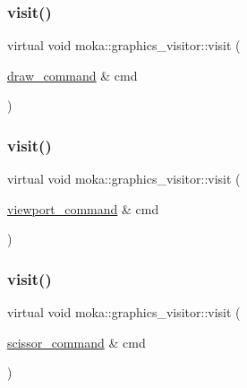 \mbox{\label{classmoka_1_1graphics__visitor_a706120c8d7ec9a21f347f06ff56ad8c9}} 
\subsubsection{\texorpdfstring{visit()}{visit()}\hspace{0.1cm}{\footnotesize\ttfamily [2/10]}}
{\footnotesize\ttfamily virtual void moka\+::graphics\+\_\+visitor\+::visit (\begin{DoxyParamCaption}\item[{\mbox{\hyperlink{classmoka_1_1draw__command}{draw\+\_\+command}} \&}]{cmd }\end{DoxyParamCaption})\hspace{0.3cm}{\ttfamily [pure virtual]}}

\mbox{\label{classmoka_1_1graphics__visitor_a1808e0ed3533d53505bb15d559a7b3f7}} 
\subsubsection{\texorpdfstring{visit()}{visit()}\hspace{0.1cm}{\footnotesize\ttfamily [3/10]}}
{\footnotesize\ttfamily virtual void moka\+::graphics\+\_\+visitor\+::visit (\begin{DoxyParamCaption}\item[{\mbox{\hyperlink{classmoka_1_1viewport__command}{viewport\+\_\+command}} \&}]{cmd }\end{DoxyParamCaption})\hspace{0.3cm}{\ttfamily [pure virtual]}}

\mbox{\label{classmoka_1_1graphics__visitor_acba017a4df89e43b253cb99845be729b}} 
\subsubsection{\texorpdfstring{visit()}{visit()}\hspace{0.1cm}{\footnotesize\ttfamily [4/10]}}
{\footnotesize\ttfamily virtual void moka\+::graphics\+\_\+visitor\+::visit (\begin{DoxyParamCaption}\item[{\mbox{\hyperlink{classmoka_1_1scissor__command}{scissor\+\_\+command}} \&}]{cmd }\end{DoxyParamCaption})\hspace{0.3cm}{\ttfamily [pure virtual]}}


